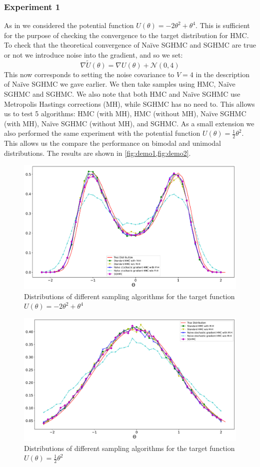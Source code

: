\subsubsection*{Experiment 1}
As in \cite{sghmc} we considered the potential function $U(\theta) = -2\theta^2 + \theta^4$. This is sufficient for the purpose of checking the convergence to the target distribution for HMC. To check that the theoretical convergence of Naïve SGHMC and SGHMC are true or not we introduce noise into the gradient, and so we set:
$$\nabla \widetilde{U}(\theta) = \nabla U(\theta) + \mathcal{N}(0,4)$$
This now corresponds to setting the noise covariance to $V=4$ in the description of Naïve SGHMC we gave earlier. We then take samples using HMC, Naïve SGHMC and SGHMC. We also note that both HMC and Naïve SGHMC use Metropolis Hastings corrections (MH), while SGHMC has no need to. This allows us to test 5 algorithms: HMC (with MH), HMC (without MH), Naïve SGHMC (with MH), Naïve SGHMC (without MH), and SGHMC. As a small extension we also performed the same experiment with the potential function $U(\theta) = \frac 1 2\theta^2$. This allows us the compare the performance on bimodal and unimodal distributions. The results are shown in \cref{fig:demo1,fig:demo2}.
\begin{figure}[h!]
  \includegraphics[width=.9\linewidth]{parts/Images/fig1a.pdf}
  \caption{Distributions of different sampling algorithms for the target function $U(\theta) = -2\theta^2 + \theta^4$}
  \label{fig1a}
  \label{fig:demo1}
\end{figure}
\begin{figure}[h!]
  \includegraphics[width=.9\linewidth]{parts/Images/fig1b.pdf}
  \caption{Distributions of different sampling algorithms for the target function $U(\theta) = \frac{1}{2}\theta^2$}
  \label{fig:demo2}
\end{figure}
